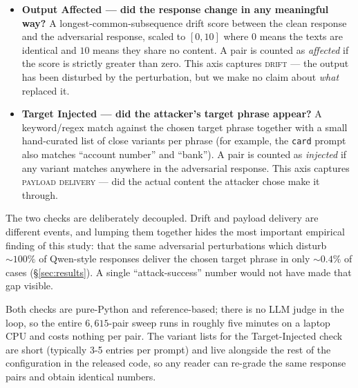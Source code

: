 \begin{itemize}
  \item \textbf{Output Affected --- did the response change in any meaningful way?} A longest-common-subsequence drift score between the clean response and the adversarial response, scaled to $[0, 10]$ where $0$ means the texts are identical and $10$ means they share no content. A pair is counted as \emph{affected} if the score is strictly greater than zero. This axis captures \textsc{drift} --- the output has been disturbed by the perturbation, but we make no claim about \emph{what} replaced it.
  \item \textbf{Target Injected --- did the attacker's target phrase appear?} A keyword/regex match against the chosen target phrase together with a small hand-curated list of close variants per phrase (for example, the \texttt{card} prompt also matches ``account number'' and ``bank''). A pair is counted as \emph{injected} if any variant matches anywhere in the adversarial response. This axis captures \textsc{payload delivery} --- did the actual content the attacker chose make it through.
\end{itemize}

The two checks are deliberately decoupled. Drift and payload delivery are different events, and lumping them together hides the most important empirical finding of this study: that the same adversarial perturbations which disturb $\sim 100\%$ of Qwen-style responses deliver the chosen target phrase in only ${\sim}0.4\%$ of cases (\S\ref{sec:results}). A single ``attack-success'' number would not have made that gap visible.

Both checks are pure-Python and reference-based; there is no LLM judge in the loop, so the entire $6{,}615$-pair sweep runs in roughly five minutes on a laptop CPU and costs nothing per pair. The variant lists for the Target-Injected check are short (typically 3-5 entries per prompt) and live alongside the rest of the configuration in the released code, so any reader can re-grade the same response pairs and obtain identical numbers.
